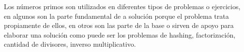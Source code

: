 Los números primos son utilizados en diferentes tipos de problemas o ejercicios, en algunos son la parte fundamental de a solución porque el problema trata propiamente de ellos, en otros son las parte de la base o sirven de apoyo para elaborar una solución como puede ser los problemas de hashing, factorización, cantidad de divisores, inverso multiplicativo.